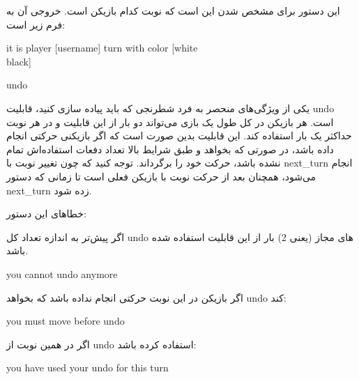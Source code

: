 \documentclass[]{article}
\begin{document}
این دستور برای مشخص شدن این است که نوبت کدام بازیکن است. خروجی آن به فرم زیر است:



\begin{tcolorbox}[boxrule=0pt]
	\begin{latin}
  	  \large{
  	  	it is player [username] turn with color [white\\black]
		}
	\end{latin}
\end{tcolorbox}


\hrulefill



\begin{tcolorbox}[boxrule=0pt]
	\begin{latin}
  	  \large{
  	  	undo
		}
	\end{latin}
\end{tcolorbox}

یکی از ویژگی‌های منحصر به فرد شطرنجی که باید پیاده سازی کنید، قابلیت undo است. هر بازیکن در کل طول یک بازی می‌تواند دو بار از این قابلیت و در هر نوبت حداکثر یک بار استفاده کند. این قابلیت بدین صورت است که اگر بازیکنی حرکتی انجام داده باشد، در صورتی که بخواهد و طبق شرایط بالا تعداد دفعات استفاده‌اش تمام نشده باشد، حرکت خود را برگرداند. توجه کنید که چون تغییر نوبت با next\_turn انجام می‌شود، همچنان بعد از حرکت نوبت با بازیکن فعلی است تا زمانی که دستور next\_turn زده شود.

خطاهای این دستور:

اگر پیش‌تر به اندازه تعداد کل undo های مجاز (یعنی 2) بار از این قابلیت استفاده شده باشد.


\begin{tcolorbox}[boxrule=0pt]
	\begin{latin}
  	  \large{
  	  	you cannot undo anymore
		}
	\end{latin}
\end{tcolorbox}

اگر بازیکن در این نوبت حرکتی انجام نداده باشد که بخواهد undo کند:


\begin{tcolorbox}[boxrule=0pt]
	\begin{latin}
  	  \large{
  	  	you must move before undo
		}
	\end{latin}
\end{tcolorbox}

اگر در همین نوبت از undo استفاده کرده باشد:



\begin{tcolorbox}[boxrule=0pt]
	\begin{latin}
  	  \large{
  	  	you have used your undo for this turn
		}
	\end{latin}
\end{tcolorbox}
\end{document}
